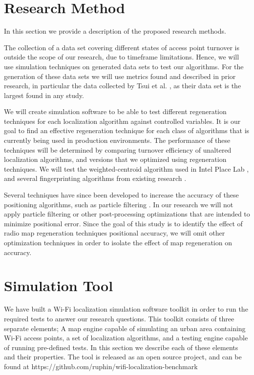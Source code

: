 \documentclass{sig-alternate-br}
\begin{document}
\section{Research Method}
In this section we provide a description of the proposed research methods. 

The collection of a data set covering different states of access point turnover is outside the scope of our research, due to timeframe limitations. Hence, we will use simulation techniques on generated data sets to test our algorithms. For the generation of these data sets we will use metrics found and described in prior research, in particular the data collected by Tsui et al. \cite{tsui:war-walking}, as their data set is the largest found in any study.

We will create simulation software to be able to test different regeneration techniques for each localization algorithm against controlled variables. It is our goal to find an effective regeneration technique for each class of algorithms that is currently being used in production environments. The performance of these techniques will be determined by comparing turnover efficiency of unaltered localization algorithms, and versions that we optimized using regeneration techniques. We will test the weighted-centroid algorithm used in Intel Place Lab \cite{cheng:metropolitan-scale}, and several fingerprinting algorithms from existing research \cite{cheng:metropolitan-scale,tsui:war-walking}.

Several techniques have since been developed to increase the accuracy of these positioning algorithms, such as particle filtering \cite{hightower:particle-filter}. In our research we will not apply particle filtering or other post-processing optimizations that are intended to minimize positional error. Since the goal of this study is to identify the effect of radio map regeneration techniques positional accuracy, we will omit other optimization techniques in order to isolate the effect of map regeneration on accuracy.

\section{Simulation Tool}
We have built a Wi-Fi localization simulation software toolkit in order to run the required tests to answer our research questions. This toolkit consists of three separate elements; A map engine capable of simulating an urban area containing Wi-Fi access points, a set of localization algorithms, and a testing engine capable of running pre-defined tests.  In this section we describe each of these elements and their properties. The tool is released as an open source project, and can be found at https://github.com/ruphin/wifi-localization-benchmark
\end{document}
